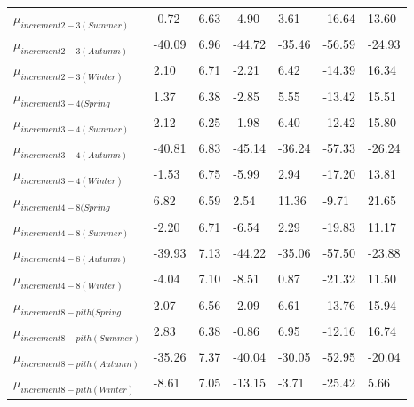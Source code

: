 \documentclass{article}\usepackage[]{graphicx}\usepackage[]{color}
\begin{document}
\begin{table}[ht]
\begin{tabular}{|p{}|p{}|p{}|p{}|p{}|p{}|p{}|}
  $\mu_{increment 2-3 (Summer)}$ & -0.72 & 6.63 & -4.90 & 3.61 & -16.64 & 13.60 \\ 
  $\mu_{increment 2-3 (Autumn)}$ & -40.09 & 6.96 & -44.72 & -35.46 & -56.59 & -24.93 \\ 
  $\mu_{increment 2-3 (Winter)}$ & 2.10 & 6.71 & -2.21 & 6.42 & -14.39 & 16.34 \\ 
  $\mu_{increment 3-4 (Spring}$ & 1.37 & 6.38 & -2.85 & 5.55 & -13.42 & 15.51 \\ 
  $\mu_{increment 3-4 (Summer)}$ & 2.12 & 6.25 & -1.98 & 6.40 & -12.42 & 15.80 \\ 
  $\mu_{increment 3-4 (Autumn)}$ & -40.81 & 6.83 & -45.14 & -36.24 & -57.33 & -26.24 \\ 
  $\mu_{increment 3-4 (Winter)}$ & -1.53 & 6.75 & -5.99 & 2.94 & -17.20 & 13.81 \\ 
  $\mu_{increment 4-8 (Spring}$ & 6.82 & 6.59 & 2.54 & 11.36 & -9.71 & 21.65 \\ 
  $\mu_{increment 4-8 (Summer)}$ & -2.20 & 6.71 & -6.54 & 2.29 & -19.83 & 11.17 \\ 
  $\mu_{increment 4-8 (Autumn)}$ & -39.93 & 7.13 & -44.22 & -35.06 & -57.50 & -23.88 \\ 
  $\mu_{increment 4-8 (Winter)}$ & -4.04 & 7.10 & -8.51 & 0.87 & -21.32 & 11.50 \\ 
  $\mu_{increment 8-pith (Spring}$ & 2.07 & 6.56 & -2.09 & 6.61 & -13.76 & 15.94 \\ 
  $\mu_{increment 8-pith (Summer)}$ & 2.83 & 6.38 & -0.86 & 6.95 & -12.16 & 16.74 \\ 
  $\mu_{increment 8-pith (Autumn)}$ & -35.26 & 7.37 & -40.04 & -30.05 & -52.95 & -20.04 \\ 
  $\mu_{increment 8-pith (Winter)}$ & -8.61 & 7.05 & -13.15 & -3.71 & -25.42 & 5.66 \\ 
   \hline
\end{tabular}
\endgroup
\end{table}
\end{document}
